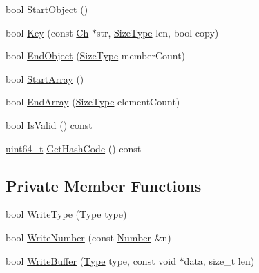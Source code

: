 \begin{DoxyCompactItemize}
\item 
bool \mbox{\hyperlink{classrapidjson_1_1internal_1_1_hasher_ae0e68c1bca3afd6e7936a3943a804378}{Start\+Object}} ()
\item 
bool \mbox{\hyperlink{classrapidjson_1_1internal_1_1_hasher_a64c20a13100e8d5e114de5d257be64fe}{Key}} (const \mbox{\hyperlink{classrapidjson_1_1internal_1_1_hasher_ae583d393fe48a90f9369f1fb5e488ab9}{Ch}} $\ast$str, \mbox{\hyperlink{namespacerapidjson_a44eb33eaa523e36d466b1ced64b85c84}{Size\+Type}} len, bool copy)
\item 
bool \mbox{\hyperlink{classrapidjson_1_1internal_1_1_hasher_a7f5893ab1f133ddaa3b7adcf2b3f6b18}{End\+Object}} (\mbox{\hyperlink{namespacerapidjson_a44eb33eaa523e36d466b1ced64b85c84}{Size\+Type}} member\+Count)
\item 
bool \mbox{\hyperlink{classrapidjson_1_1internal_1_1_hasher_a37b1cc8f2402d5911d7e9c7cfb5ec5e9}{Start\+Array}} ()
\item 
bool \mbox{\hyperlink{classrapidjson_1_1internal_1_1_hasher_af013a84604951d02c428fb16ab7563cd}{End\+Array}} (\mbox{\hyperlink{namespacerapidjson_a44eb33eaa523e36d466b1ced64b85c84}{Size\+Type}} element\+Count)
\item 
bool \mbox{\hyperlink{classrapidjson_1_1internal_1_1_hasher_a8058a7b946045b1e7bba68f76824b68c}{Is\+Valid}} () const
\item 
\mbox{\hyperlink{stdint_8h_aec6fcb673ff035718c238c8c9d544c47}{uint64\+\_\+t}} \mbox{\hyperlink{classrapidjson_1_1internal_1_1_hasher_ab8f966390fc5ff0ec38fe4b4f54af06d}{Get\+Hash\+Code}} () const
\end{DoxyCompactItemize}
\subsection*{Private Member Functions}
\begin{DoxyCompactItemize}
\item 
bool \mbox{\hyperlink{classrapidjson_1_1internal_1_1_hasher_a38c3fa29ed0785550056bc8efe351e8e}{Write\+Type}} (\mbox{\hyperlink{namespacerapidjson_ae79a4751c1c460ff0de5ecc07874f3e4}{Type}} type)
\item 
bool \mbox{\hyperlink{classrapidjson_1_1internal_1_1_hasher_a418e6879438249ca3120b90afaa8f05c}{Write\+Number}} (const \mbox{\hyperlink{structrapidjson_1_1internal_1_1_hasher_1_1_number}{Number}} \&n)
\item 
bool \mbox{\hyperlink{classrapidjson_1_1internal_1_1_hasher_a2a1680589f6410879ec277736181209b}{Write\+Buffer}} (\mbox{\hyperlink{namespacerapidjson_ae79a4751c1c460ff0de5ecc07874f3e4}{Type}} type, const void $\ast$data, size\+\_\+t len)
\end{DoxyCompactItemize}
